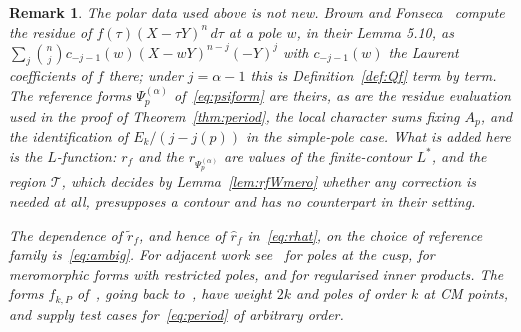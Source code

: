 \documentclass[11pt]{article}
\newtheorem{remark}[theorem]{Remark}
\begin{document}
\begin{remark}\label{rem:literature}
\emph{The polar data used above is not new. Brown and Fonseca~\cite{BrownFonseca2025} compute the residue
of $f(\tau)(X-\tau Y)^{n}\,d\tau$ at a pole $w$, in their Lemma 5.10, as
$\sum_{j}\binom{n}{j}c_{-j-1}(w)(X-wY)^{n-j}(-Y)^{j}$ with $c_{-j-1}(w)$ the Laurent coefficients
of $f$ there; under $j=\alpha-1$ this is Definition~\ref{def:Qf} term by term. The reference forms
$\Psi^{(\alpha)}_p$ of~\eqref{eq:psiform} are theirs, as are the residue evaluation used in the
proof of Theorem~\ref{thm:period}, the local character sums fixing $A_p$, and the identification of
$E_k/(j-j(p))$ in the simple-pole case. What
is added here is the $L$-function: $r_f$ and the $r_{\Psi^{(\alpha)}_p}$ are values of the
finite-contour $L^*$, and the region $\mathcal{T}$, which decides by
Lemma~\ref{lem:rfWmero} whether any correction is needed at all, presupposes a contour and has no
counterpart in their setting.}

\emph{The dependence of $\tilde r_f$, and hence of $\hat r_f$ in~\eqref{eq:rhat}, on the choice of
reference family is~\eqref{eq:ambig}. For adjacent work see~\cite{BrownHain2018}
for poles at the cusp, \cite{Matthes2022} for meromorphic forms with restricted poles, and
\cite{BKvP2019} for regularised inner products. The forms $f_{k,P}$
of~\cite{LobrichSchwagenscheidt2022}, going back to~\cite{Zagier1977}, have weight $2k$ and poles
of order $k$ at CM points, and supply test cases for~\eqref{eq:period} of arbitrary order.}
\end{remark}
\end{document}
